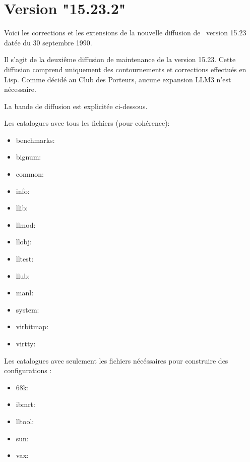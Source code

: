 

\Begin
{}


                 
                            
\chapter {Version "15.23.2"}
Voici les corrections et les extensions de la nouvelle diffusion de
\LeLisp\ version 15.23 dat\'{e}e du 30 septembre 1990.

Il s'agit de la deuxi\^{e}me diffusion de maintenance de la version
15.23.  Cette diffusion comprend uniquement des 
contournements et corrections effectu\'{e}s en Lisp.  
Comme d\'{e}cid\'{e} au Club des Porteurs, aucune expansion LLM3 n'est n\'{e}cessaire.


La bande de diffusion est explicit\'{e}e ci-dessous.

Les catalogues avec tous les fichiers (pour coh\'{e}rence):

\begin {itemize}
\item   benchmarks:
\item   bignum:
\item   common: 
\item   info:
\item   llib:           
\item   llmod:
\item   llobj:
\item   lltest:         
\item   llub:   
\item   manl:
\item   system:
\item   virbitmap:
\item   virtty: 
\end {itemize}

Les catalogues avec seulement les fichiers n\'{e}c\'{e}ssaires pour construire
des configurations :

\begin {itemize}
\item   68k:            
\item   ibmrt:
\item   lltool:
\item   sun:
\item   vax:
\end {itemize}

